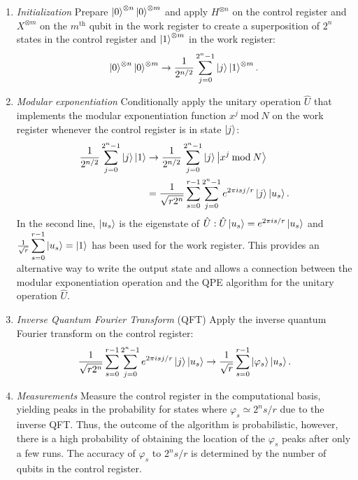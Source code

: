 \begin{enumerate}
\item \emph{Initialization}\newline
Prepare $\ket{0}^{\otimes n}\ket{0}^{\otimes m}$ and apply $H^{\otimes n}$ on the control register and $X^{\otimes m}$ on the $m^\text{th}$ qubit in the work register to create a superposition of $2^n$ states in the control register and $\ket{1}^{\otimes m}$ in the work register:
\begin{align*}
    \ket{0}^{\otimes n}\ket{0}^{\otimes m}\to \frac{1}{2^{n/2}}\displaystyle\sum_{j=0}^{2^n-1} \ket{j}\ket{1}^{\otimes m}.
\end{align*}

\item \emph{Modular exponentiation}\newline
Conditionally apply the unitary operation $\hat{U}$ that implements the modular exponentiation function $x^j\>\text{mod}\>N$ on the work register whenever the control register is in state $\ket{j}$:
\begin{align*}
    \frac{1}{2^{n/2}} \displaystyle\sum_{j=0}^{2^n -1} \ket{j}\ket{1} & \to \frac{1}{2^{n/2}}\displaystyle\sum_{j=0}^{2^n-1}
    \ket{j}\ket{x^j\>\text{mod}\>N} \\
    & =
    \frac{1}{\sqrt{r2^n}}\displaystyle\sum_{s=0}^{r-1}\displaystyle\sum_{j=0}^{2^n-1}
    e^{2\pi i s j / r}\ket{j}\ket{u_s}. \\
\end{align*}
In the second line, $\ket{u_s}$ is the eigenstate of $\hat{U}: \hat{U}\ket{u_s} = e^{2\pi i s/r}\ket{u_s}$ and $\frac{1}{\sqrt{r}}\displaystyle\sum_{s=0}^{r-1}\ket{u_s} = \ket{1}$ has been used for the work register. This provides an alternative way to write the output state and allows a connection between the modular exponentiation operation and the \acs{QPE} algorithm for the unitary operation $\hat{U}$. \label{itm:second}

\item \emph{Inverse Quantum Fourier Transform} (\acs{QFT})\newline
Apply the inverse quantum Fourier transform on the control register:
\begin{align*}
    \frac{1}{\sqrt{r2^n}}\displaystyle\sum_{s=0}^{r-1}\displaystyle\sum_{j=0}^{2^n-1}
    e^{2\pi i s j / r}\ket{j}\ket{u_s} \to \frac{1}{\sqrt{r}}\displaystyle\sum_{s=0}^{r - 1}\ket{\varphi_s}\ket{u_s}.
\end{align*}

\item \emph{Measurements}\newline
    Measure the control register in the computational basis, yielding peaks in the probability for states where $\varphi_s \simeq 2^n s / r$ due to the inverse \acs{QFT}. Thus, the outcome of the algorithm is probabilistic, however, there is a high probability of obtaining the location of the $\varphi_s$ peaks after only a few runs. The accuracy of $\varphi_s$ to $2^{n} s / r$ is determined by the number of qubits in the control register.


\end{enumerate}
